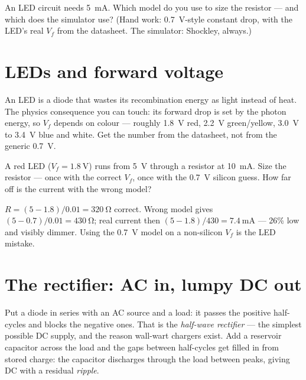 \begin{checkpoint}
An LED circuit needs \qty{5}{\milli\ampere}. Which model do you use to
size the resistor --- and which does the simulator use? (Hand work:
\qty{0.7}{\volt}-style constant drop, with the LED's real $V_f$ from the
datasheet. The simulator: Shockley, always.)
\end{checkpoint}

\section{LEDs and forward voltage}\label{sec:diode-led}

An LED is a diode that wastes its recombination energy as light instead
of heat. The physics consequence you can touch: its forward drop is set
by the photon energy, so $V_f$ depends on colour --- roughly
\qty{1.8}{\volt} red, \qty{2.2}{\volt} green/yellow, \qty{3.0}{\volt} to
\qty{3.4}{\volt} blue and white. Get the number from the datasheet, not
from the generic \qty{0.7}{\volt}.

\begin{exercise}[easy]
A red LED ($V_f=\qty{1.8}{\volt}$) runs from \qty{5}{\volt} through a
resistor at \qty{10}{\milli\ampere}. Size the resistor --- once with the
correct $V_f$, once with the \qty{0.7}{\volt} silicon guess. How far
off is the current with the wrong model?
\begin{solution}
$R=(5-1.8)/0.01=\qty{320}{\ohm}$ correct. Wrong model gives
$(5-0.7)/0.01=\qty{430}{\ohm}$; real current then
$(5-1.8)/430=\qty{7.4}{\milli\ampere}$ --- 26\% low and visibly dimmer.
Using the \qty{0.7}{\volt} model on a non-silicon $V_f$ is the LED
mistake.
\end{solution}
\end{exercise}

\section{The rectifier: AC in, lumpy DC out}\label{sec:diode-rectifier}

Put a diode in series with an AC source and a load: it passes the
positive half-cycles and blocks the negative ones. That is the
\emph{half-wave rectifier} --- the simplest possible DC supply, and the
reason wall-wart chargers exist. Add a reservoir capacitor across the
load and the gaps between half-cycles get filled in from stored charge:
the capacitor discharges through the load between peaks, giving DC with
a residual \emph{ripple}.

